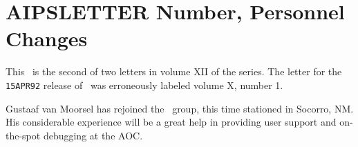 

\newcommand{\AIPRELEASE}{October 15, 1992}
\newcommand{\AIPVOLUME}{Volume XII}
\newcommand{\AIPNUMBER}{Number 2}
\newcommand{\RELEASENAME}{{\tt 15OCT92}}



\newcommand{\MYSpace}{-11pt}

\normalstyle
\section{AIPSLETTER Number, Personnel Changes}

This \AIPSLETTER\ is the second of two letters in volume XII of the
series.  The letter for the {\tt 15APR92} release of \AIPS\ was
erroneously labeled volume X, number 1.


Gustaaf van Moorsel has rejoined the \AIPS\ group, this time stationed
in Socorro, \hbox{NM}.  His considerable experience will be a great
help in providing user support and on-the-spot debugging at the AOC.


